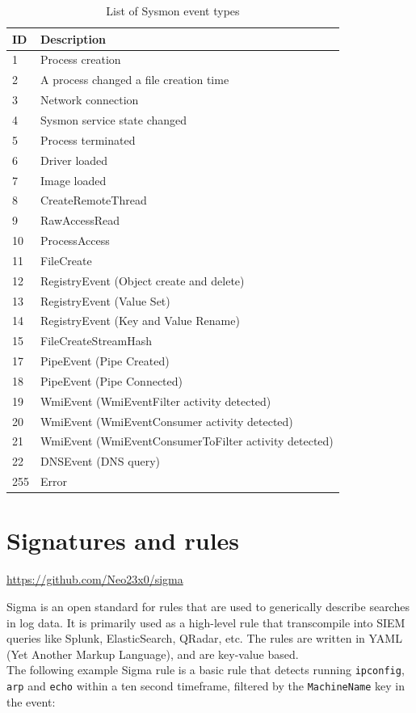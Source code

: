 \begin{table}[ht]
\begin{tabular}{l|l}
ID & Description \\ \hline
1 & Process creation \\
2 & A process changed a file creation time \\
3 & Network connection \\
4 & Sysmon service state changed \\
5 & Process terminated \\
6 & Driver loaded \\
7 & Image loaded \\
8 & CreateRemoteThread \\
9 & RawAccessRead \\
10 & ProcessAccess \\
11 & FileCreate \\
12 & RegistryEvent (Object create and delete) \\
13 & RegistryEvent (Value Set) \\
14 & RegistryEvent (Key and Value Rename) \\
15 & FileCreateStreamHash \\
17 & PipeEvent (Pipe Created) \\
18 & PipeEvent (Pipe Connected) \\
19 & WmiEvent (WmiEventFilter activity detected) \\
20 & WmiEvent (WmiEventConsumer activity detected) \\
21 & WmiEvent (WmiEventConsumerToFilter activity detected) \\
22 & DNSEvent (DNS query) \\
255 & Error
\end{tabular}
\caption{List of Sysmon event types}
\label{tab:sysmoneventtypes}
\end{table}


\section{Signatures and rules}
\url{https://github.com/Neo23x0/sigma}

Sigma is an open standard for rules that are used to generically describe searches in log data. It is primarily used as a high-level rule that transcompile into SIEM queries like Splunk, ElasticSearch, QRadar, etc. The rules are written in YAML (Yet Another Markup Language), and are key-value based.
\\
The following example Sigma rule is a basic rule that detects running \lstinline{ipconfig}, \lstinline{arp} and \lstinline{echo} within a ten second timeframe, filtered by the \lstinline{MachineName} key in the event: 

